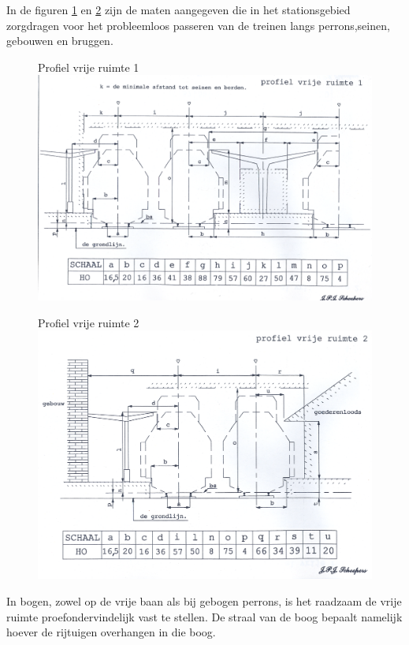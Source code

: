 \documentclass[12pt,a4paper]{report}
\begin{document}
In de figuren \ref{figuur15} en \ref{figuur16} zijn de maten aangegeven die in het stationsgebied zorgdragen voor het probleemloos passeren van de treinen langs perrons,seinen, gebouwen en bruggen.

\begin{figure}[ht]
  \captionbox
  {Profiel vrije ruimte 1\label{figuur15}}
  {\includegraphics[scale=0.6]{images/rcu_figuur15}}
\end{figure}

\begin{figure}[ht]
  \captionbox
  {Profiel vrije ruimte 2\label{figuur16}}
  {\includegraphics[scale=0.6]{images/rcu_figuur16}}
\end{figure}

In bogen, zowel op de vrije baan als bij gebogen perrons, is het raadzaam de vrije ruimte proefondervindelijk vast te stellen. De straal van de boog bepaalt namelijk hoever de rijtuigen overhangen in die boog.
\end{document}
